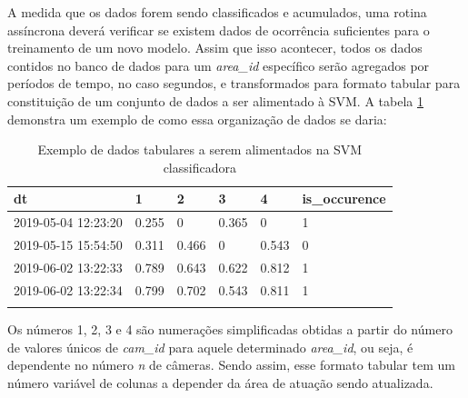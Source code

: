 \documentclass[]{politex}
\begin{document}
A medida que os dados forem sendo classificados e acumulados, uma rotina assíncrona deverá verificar se existem dados de ocorrência suficientes para o treinamento de um novo modelo. Assim que isso acontecer, todos os dados contidos no banco de dados para um \textit{area\_id} específico serão agregados por períodos de tempo, no caso segundos, e transformados para formato tabular para constituição de um conjunto de dados a ser alimentado à SVM. A tabela \ref{tbl:svmdata} demonstra um exemplo de como essa organização de dados se daria:

\begin{table}[h]
\centering
\begin{tabular}{llllll}
\hline
\multicolumn{1}{|l|}{\textbf{dt}}         & \multicolumn{1}{l|}{\textbf{1}} & \multicolumn{1}{l|}{\textbf{2}} & \multicolumn{1}{l|}{\textbf{3}} & \multicolumn{1}{l|}{\textbf{4}} & \multicolumn{1}{l|}{\textbf{is\_occurence}} \\ \hline
\multicolumn{1}{|l|}{2019-05-04 12:23:20} & \multicolumn{1}{l|}{0.255}      & \multicolumn{1}{l|}{0}          & \multicolumn{1}{l|}{0.365}      & \multicolumn{1}{l|}{0}          & \multicolumn{1}{l|}{1}                      \\ \hline
\multicolumn{1}{|l|}{2019-05-15 15:54:50} & \multicolumn{1}{l|}{0.311}      & \multicolumn{1}{l|}{0.466}      & \multicolumn{1}{l|}{0}          & \multicolumn{1}{l|}{0.543}      & \multicolumn{1}{l|}{0}                      \\ \hline
\multicolumn{1}{|l|}{2019-06-02 13:22:33} & \multicolumn{1}{l|}{0.789}      & \multicolumn{1}{l|}{0.643}      & \multicolumn{1}{l|}{0.622}      & \multicolumn{1}{l|}{0.812}      & \multicolumn{1}{l|}{1}                      \\ \hline
\multicolumn{1}{|l|}{2019-06-02 13:22:34} & \multicolumn{1}{l|}{0.799}      & \multicolumn{1}{l|}{0.702}      & \multicolumn{1}{l|}{0.543}      & \multicolumn{1}{l|}{0.811}      & \multicolumn{1}{l|}{1}                      \\ \hline
                                          &                                 &                                 &                                 &                                 &                                            
\end{tabular}
\caption{Exemplo de dados tabulares a serem alimentados na SVM classificadora}
\label{tbl:svmdata}
\end{table}

Os números 1, 2, 3 e 4 são numerações simplificadas obtidas a partir do número de valores únicos de \textit{cam\_id} para aquele determinado \textit{area\_id}, ou seja, é dependente no número \textit{n} de câmeras. Sendo assim, esse formato tabular tem um número variável de colunas a depender da área de atuação sendo atualizada.
\end{document}
